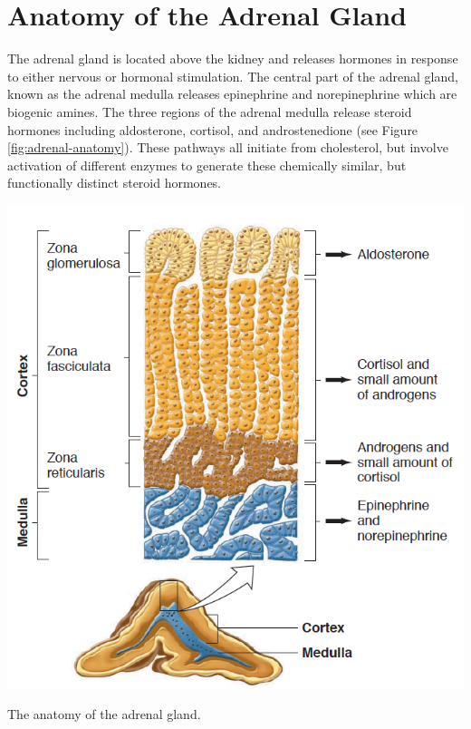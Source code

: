 \documentclass{tufte-handout}
\begin{document}
\pagebreak

\section{Anatomy of the Adrenal Gland}

The adrenal gland is located above the kidney and releases hormones in response to either nervous or hormonal stimulation.  The central part of the adrenal gland, known as the adrenal medulla releases epinephrine and norepinephrine which are biogenic amines.  The three regions of the adrenal medulla release steroid hormones including aldosterone, cortisol, and androstenedione (see Figure \ref{fig:adrenal-anatomy}).  These pathways all initiate from cholesterol, but involve activation of different enzymes to generate these chemically similar, but functionally distinct steroid hormones.

\begin{marginfigure}
  \includegraphics{figures/adrenal-anatomy}
  \caption{The anatomy of the adrenal gland.}
    \label{fig:adrenal-anatomy}
\end{marginfigure}
\end{document}
